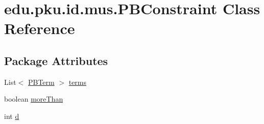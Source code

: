 \hypertarget{classedu_1_1pku_1_1id_1_1mus_1_1_p_b_constraint}{
\section{edu.pku.id.mus.PBConstraint Class Reference}
\label{classedu_1_1pku_1_1id_1_1mus_1_1_p_b_constraint}
}
\subsection*{Package Attributes}
\begin{DoxyCompactItemize}
\item 
List$<$ \hyperlink{classedu_1_1pku_1_1id_1_1mus_1_1_p_b_term}{PBTerm} $>$ \hyperlink{classedu_1_1pku_1_1id_1_1mus_1_1_p_b_constraint_a03ef1c0dde40527ca29e6dbee8681c32}{terms}
\item 
boolean \hyperlink{classedu_1_1pku_1_1id_1_1mus_1_1_p_b_constraint_a0a1a9567c235d67ba178e32e5553895f}{moreThan}
\item 
int \hyperlink{classedu_1_1pku_1_1id_1_1mus_1_1_p_b_constraint_aba05cbcec0b67e25174fe0cfbf54e121}{d}
\end{DoxyCompactItemize}


